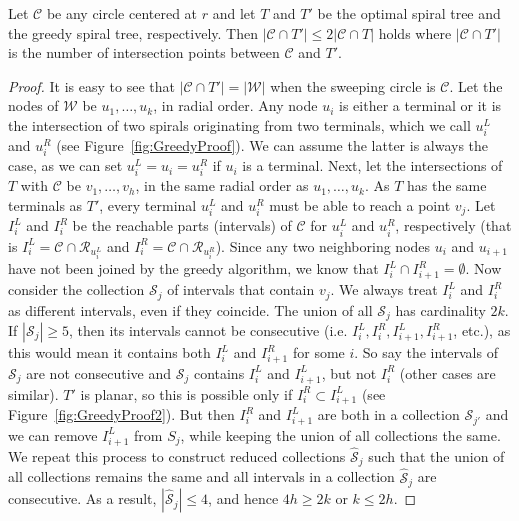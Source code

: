 \documentclass{journalA4}
\begin{document}
\begin{lemma}
\label{lem:greedycircleisects} Let $\mathcal{C}$ be any circle centered at $r$ and let $T$ and $T'$ be the optimal spiral tree and the greedy spiral tree, respectively. Then $|\mathcal{C} \cap T'| \leq 2 |\mathcal{C} \cap T|$ holds where $|\mathcal{C} \cap T'|$ is the number of intersection points between $\mathcal{C}$ and $T'$.
\end{lemma}
\begin{proof}
It is easy to see that $|\mathcal{C} \cap T'| = |\mathcal{W}|$ when the sweeping circle is $\mathcal{C}$. Let the nodes of $\mathcal{W}$ be $u_1,
\ldots, u_k$, in radial order. Any node $u_i$ is either a terminal or it is the intersection of two spirals originating from two terminals, which we call $u^L_i$ and $u^R_i$ (see
Figure~\ref{fig:GreedyProof}). We can assume the latter is always the case, as we can set $u^L_i = u_i = u^R_i$ if $u_i$ is a terminal. Next, let the intersections of $T$ with
$\mathcal{C}$ be $v_1, \ldots, v_h$, in the same radial order as $u_1, \ldots, u_k$. As $T$ has the same terminals as $T'$, every terminal $u^L_i$ and $u^R_i$ must be able to reach a point $v_j$. Let
$I^L_i$ and $I^R_i$ be the reachable parts (intervals) of $\mathcal{C}$ for $u^L_i$ and $u^R_i$, respectively (that is $I^L_i = \mathcal{C} \cap \mathcal{R}_{u^L_i}$ and $I^R_i = \mathcal{C} \cap \mathcal{R}_{u^R_i}$). Since any two neighboring nodes $u_i$ and $u_{i+1}$ have not been joined by the greedy algorithm, we know that $I^L_i \cap I^R_{i+1} = \emptyset$. Now consider the
collection $\mathcal{S}_j$ of intervals that contain $v_j$. We always treat $I^L_i$ and $I^R_i$ as different intervals, even if they coincide. The union of all $\mathcal{S}_j$ has cardinality $2 k$. If $|\mathcal{S}_j| \geq 5$, then its intervals cannot be
consecutive (i.e. $I^L_i, I^R_i, I^L_{i+1}, I^R_{i+1}$, etc.), as this would mean it contains both $I^L_i$ and $I^R_{i+1}$ for some $i$. So say the intervals of $\mathcal{S}_j$ are not consecutive and $\mathcal{S}_j$ contains $I^L_{i}$
and $I^L_{i+1}$, but not $I^R_i$ (other cases are similar). $T'$ is planar, so this is possible only if $I^R_i \subset I^L_{i+1}$ (see Figure~\ref{fig:GreedyProof2}). But then
$I^R_i$ and $I^L_{i+1}$ are both in a collection $\mathcal{S}_{j'}$ and we can remove $I^L_{i+1}$ from $S_j$, while keeping the union of all collections the same. We repeat this process to construct reduced collections $\hat{\mathcal{S}}_j$ such
that the union of all collections remains the same and all intervals in a collection $\hat{\mathcal{S}}_j$ are consecutive. As a result, $|\hat{\mathcal{S}}_j| \leq 4$, and hence $4h \geq 2k$
or $k \leq 2h$.
\end{proof}
\end{document}
